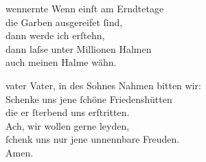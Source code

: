 \documentclass[tocstyle=ref-genre]{ees}
\begin{document}
{\begin{movement}{wennernte}
  \voice[Soprano]
  Wenn einſt am Erndtetage\\
  die Garben ausgereifet ſind,\\
  dann werde ich erſtehn,\\
  dann laſse unter Millionen Halmen\\
  auch meinen Halme wähn.
\end{movement}

\begin{movement}{vater}
  \voice[Coro]
  Vater, in des Sohnes Nahmen bitten wir:\\
  Schenke uns jene ſchöne Friedenshütten\\
  die er ſterbend uns erſtritten.\\
  Ach, wir wollen gerne leyden,\\
  ſchenk uns nur jene unnennbare Freuden.\\
  Amen.
\end{movement}
}

\eesScore
\end{document}
